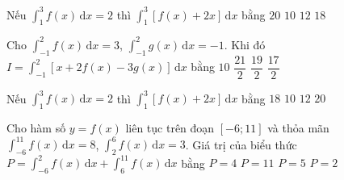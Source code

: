 \begin{ex}%
	Nếu $\displaystyle\int_1^3 f(x)\,\mathrm{d}x = 2$ thì  $\displaystyle\int_1^3\left[f(x) + 2x\right]\,\mathrm{d}x$ bằng
	 \choice
		 {$20$}
		 {\True $10$}
		 {$12$}
		 {$18$}
\end{ex}

\begin{ex}%
	Cho $\displaystyle\int_{-1}^2{f(x)\mathrm{\,d}x}=3$, $\displaystyle\int_{-1}^2{g(x)\mathrm{\,d}x}=-1$.  Khi đó $I=\displaystyle\int_{-1}^2{\left[x+2f(x)-3g(x)\right]\mathrm{\,d}x}$ bằng
	\choice 
		{$10$} 
		{\True $\dfrac{21}2$} 
		{$\dfrac{19}2$} 
		{$\dfrac{17}2$} 
\end{ex}

\begin{ex}%
	Nếu $\displaystyle\int_{1}^{3} f(x) \mathrm{\,d}x =2$ thì $\displaystyle\int_{1}^{3}[f(x)+2x] \mathrm{\,d}x $  bằng
	 \choice
		{$18$} 
		 {\True $10$}
		{$12$} 
		 {$20$}
\end{ex}

\begin{ex}%
	Cho hàm số $y=f(x)$ liên tục trên đoạn $[-6;11]$ và thỏa mãn $\displaystyle\int_{-6}^{11} f(x)\, \mathrm{d}x=8$, $\displaystyle\int_{2}^{6} f(x)\, \mathrm{d}x=3$.  Giá trị của biểu thức $P=\displaystyle\int_{-6}^{2} f(x)\, \mathrm{d}x+\displaystyle\int_{6}^{11} f(x)\, \mathrm{d}x$ bằng
	\choice 
		 {$P=4$}
		{$P=11$} 
		{\True  $P=5$}
		 {$P=2$}
\end{ex}

